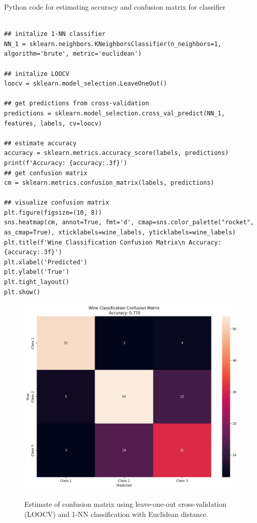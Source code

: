 \documentclass{article}
\begin{document}
\parbox{\textwidth}{Python code for estimating accuracy and confusion matrix for classifier}
\begin{center}
\begin{lstlisting}

## initalize 1-NN classifier
NN_1 = sklearn.neighbors.KNeighborsClassifier(n_neighbors=1, algorithm='brute', metric='euclidean')
  
## initalize LOOCV
loocv = sklearn.model_selection.LeaveOneOut()
  
## get predictions from cross-validation
predictions = sklearn.model_selection.cross_val_predict(NN_1, features, labels, cv=loocv)
  
## estimate accuracy
accuracy = sklearn.metrics.accuracy_score(labels, predictions)
print(f'Accuracy: {accuracy:.3f}')
## get confusion matrix
cm = sklearn.metrics.confusion_matrix(labels, predictions)
  
## visualize confusion matrix
plt.figure(figsize=(10, 8))
sns.heatmap(cm, annot=True, fmt='d', cmap=sns.color_palette("rocket", as_cmap=True), xticklabels=wine_labels, yticklabels=wine_labels)
plt.title(f'Wine Classification Confusion Matrix\n Accuracy: {accuracy:.3f}')
plt.xlabel('Predicted')
plt.ylabel('True')
plt.tight_layout()
plt.show()

\end{lstlisting}
\end{center}
  
\begin{figure}[htbp]
\includegraphics[width=1\textwidth]{q10_a.png} \\
\caption{Estimate of confusion matrix using leave-one-out cross-validation (LOOCV) and 1-NN classification with Euclidean distance.}
\label{fig:image_comparison}
\end{figure} 
\end{document}

